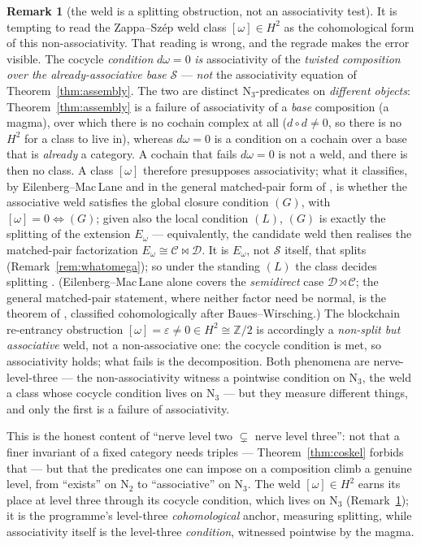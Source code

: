 \documentclass[11pt]{article}
\theoremstyle{definition}
\newtheorem{remark}[theorem]{Remark}
\newcommand{\Z}{\mathbb{Z}}
\newcommand{\sS}{\mathcal{S}}
\newcommand{\cC}{\mathcal{C}}
\newcommand{\cD}{\mathcal{D}}
\newcommand{\Nerve}{\mathrm{N}}
\begin{document}
\begin{remark}[the weld is a splitting obstruction, not an associativity test]\label{rem:weldsplit}
It is tempting to read the Zappa--Sz\'ep weld class $[\omega]\in H^2$ as the cohomological form of this
non-associativity. That reading is wrong, and the regrade makes the error visible. The cocycle
\emph{condition} $d\omega=0$ \emph{is} associativity of the \emph{twisted composition over the
already-associative base} $\sS$ --- \emph{not} the associativity equation of
Theorem~\ref{thm:assembly}. The two are distinct $\Nerve_3$-predicates on \emph{different objects}:
Theorem~\ref{thm:assembly} is a failure of associativity of a \emph{base} composition (a magma), over
which there is no cochain complex at all ($d\circ d\neq0$, so there is no $H^2$ for a class to live
in), whereas $d\omega=0$ is a condition on a cochain over a base that is \emph{already} a category. A
cochain that fails $d\omega=0$ is not a weld, and there is then no class. A class $[\omega]$ therefore
presupposes associativity; what it classifies, by Eilenberg--Mac\,Lane and in the general matched-pair
form of \cite{MacBethZS}, is whether the associative weld satisfies the global closure condition
$(G)$, with $[\omega]=0\Leftrightarrow(G)$; given also the local condition $(L)$, $(G)$ is exactly the
splitting of the extension $E_\omega$ --- equivalently, the candidate weld then realises the
matched-pair factorization $E_\omega\cong\cC\bowtie\cD$. It is $E_\omega$, not $\sS$ itself, that splits
(Remark~\ref{rem:whatomega}); so under the standing $(L)$ the class decides splitting \cite{MacBethZS}. (Eilenberg--Mac\,Lane alone covers the \emph{semidirect}
case $\cD\rtimes\cC$; the general matched-pair statement, where neither factor need be normal, is the
theorem of \cite{MacBethZS}, classified cohomologically after Baues--Wirsching.) The blockchain re-entrancy obstruction
$[\omega]=\varepsilon\neq 0\in H^2\cong\Z/2$ \cite{MacBethReentrancy} is accordingly a \emph{non-split
but associative} weld, not a non-associative one: the cocycle condition is met, so associativity holds;
what fails is the decomposition. Both phenomena are nerve-level-three --- the non-associativity witness
a pointwise condition on $\Nerve_3$, the weld a class whose cocycle condition lives on $\Nerve_3$ ---
but they measure different things, and only the first is a failure of associativity.
\end{remark}

This is the honest content of ``nerve level two $\subsetneq$ nerve level three'': not that a finer
invariant of a fixed category needs triples --- Theorem~\ref{thm:coskel} forbids that --- but that the
predicates one can impose on a composition climb a genuine level, from ``exists'' on $\Nerve_2$ to
``associative'' on $\Nerve_3$. The weld $[\omega]\in H^2$ earns its place at level three through its
cocycle condition, which lives on $\Nerve_3$ (Remark~\ref{rem:weldsplit}); it is the programme's
level-three \emph{cohomological} anchor, measuring splitting, while associativity itself is the
level-three \emph{condition}, witnessed pointwise by the magma.
\end{document}

